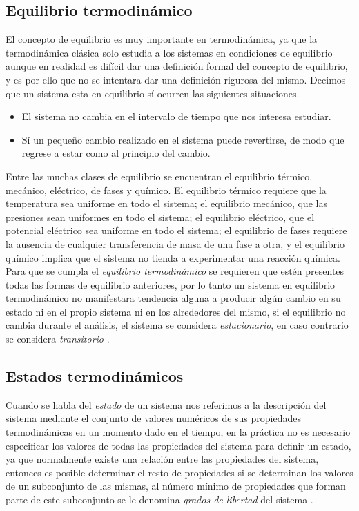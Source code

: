 \documentclass[../master.tex]{subfiles}
\begin{document}
\subsection{Equilibrio termodinámico}

El concepto de equilibrio es muy importante en termodinámica, ya que la termodinámica clásica solo estudia a los sistemas en condiciones de equilibrio aunque en realidad es difícil dar una definición formal del concepto de equilibrio, y es por ello que no se intentara dar una definición rigurosa del mismo. Decimos que un sistema esta en equilibrio sí ocurren las siguientes situaciones.
\begin{itemize}
    \item El sistema no cambia en el intervalo de tiempo que nos interesa estudiar.
    \item Sí un pequeño cambio realizado en el sistema puede revertirse, de modo que regrese a estar como al principio del cambio.
\end{itemize}
Entre las muchas clases de equilibrio se encuentran el equilibrio térmico, mecánico, eléctrico, de fases y químico. El equilibrio térmico requiere que la temperatura sea uniforme en todo el sistema; el equilibrio mecánico, que las presiones sean uniformes en todo el sistema; el equilibrio eléctrico, que el potencial eléctrico sea uniforme en todo el sistema; el equilibrio de fases requiere la ausencia de cualquier transferencia de masa de una fase a otra, y el equilibrio químico implica que el sistema no tienda a experimentar una reacción química. Para que se cumpla el \emph{equilibrio termodinámico} se requieren que estén presentes todas las formas de equilibrio anteriores, por lo tanto un sistema en equilibrio termodinámico no manifestara tendencia alguna a producir algún cambio en su estado ni en el propio sistema ni en los alrededores del mismo, si el equilibrio no cambia durante el análisis, el sistema se considera \emph{estacionario}, en caso contrario se considera \emph{transitorio} \parencites{clavell}{wark}{bett}.

\subsection{Estados termodinámicos}

Cuando se habla del \emph{estado} de un sistema nos referimos a la descripción del sistema mediante el conjunto de valores numéricos de sus propiedades termodinámicas en un momento dado en el tiempo, en la práctica no es necesario especificar los valores de todas las propiedades del sistema para definir un estado, ya que normalmente existe una relación entre las propiedades del sistema, entonces es posible determinar el resto de propiedades si se determinan los valores de un subconjunto de las mismas, al número mínimo de propiedades que forman parte de este subconjunto se le denomina \emph{grados de libertad} del sistema \parencites{moranshapiro}{faires}{colin}.
\end{document}

